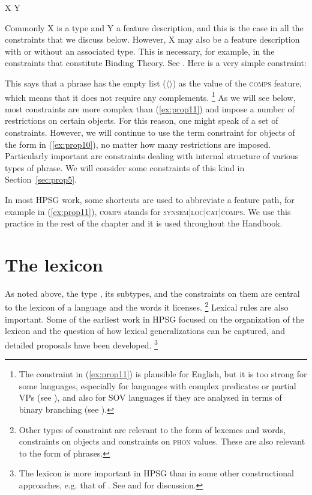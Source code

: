 \documentclass[output=paper
	        ,collection
	        ,collectionchapter
 	        ,biblatex
                ,babelshorthands
                ,newtxmath
                ,draftmode
                ,colorlinks, citecolor=brown
]{langscibook}
\begin{document}
\ea\label{ex:prop10}
X \impl Y
\z

\noindent
Commonly X is a type and Y a feature description, and this is the case in all the constraints that we discuss below. However, X may also be a feature description with or without an associated type. This is necessary, for example, in the constraints that constitute Binding Theory. See . Here is a very simple constraint:

\ea
\label{ex:prop11}
\label{ex-phrase-coonstraint}
 
\z

\noindent
This says that a phrase has the empty list ($\langle \rangle$) as the value of the \textsc{comps} feature, which means that it does not require any complements.%
%
\footnote{The constraint in (\ref{ex:prop11}) is plausible for English, but it is too strong for some languages, especially for languages with complex predicates or partial VPs (see ), and also for SOV languages if they are analysed in terms of binary branching (see ).}
%
As we will see below, most constraints are more complex than (\ref{ex:prop11}) and impose a number of restrictions on certain objects. For this reason, one might speak of a set of constraints. However, we will continue to use the term constraint for objects of the form in (\ref{ex:prop10}), no matter how many restrictions are imposed. Particularly important are constraints dealing with internal structure of various types of phrase. We will consider some constraints of this kind in Section~\ref{sec:prop5}.

In most HPSG work, some shortcuts are used to abbreviate a feature path, for example in (\ref{ex:prop11}), \textsc{comps} stands for \textsc{synsem|loc|cat|comps}. We use this practice in the rest of the chapter and it is used throughout the Handbook.


\section{The lexicon}\label{sec:prop4}
\label{prop:sec-lexicon}

As noted above, the type , its subtypes, and the constraints on them are central to the lexicon of a language and the words it licenses.%
%
\footnote{\label{fn-constraints-synsem-phon}%
Other types of constraint are relevant to the form of lexemes and words, \eg constraints on  objects and constraints on \textsc{phon} values. These are also relevant to the form of phrases.}
%
Lexical rules are also important. Some of the earliest work in HPSG focused on the organization of the lexicon and the question of how lexical generalizations can be captured, and detailed proposals have been developed.%
%
\footnote{The lexicon is more important in HPSG than in some other constructional approaches, e.g. that of \citet{Goldberg95a,Goldberg2006a}. See \citet{MWArgSt} and  for discussion.}
%
\end{document}
